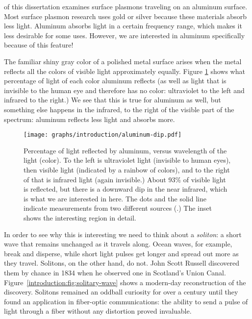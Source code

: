 of this dissertation examines surface plasmons traveling on an aluminum surface.
Most surface plasmon research uses gold or silver because these materials absorb less light.
Aluminum absorbs light in a certain frequency range, which makes it less desirable for some uses.
However, we are interested in aluminum specifically because of this feature!

The familiar shiny gray color of a polished metal surface arises when the metal reflects all the colors of visible light approximately equally.
Figure \ref{introduction:fig:aluminum-dip} shows what percentage of light of each color aluminum reflects (as well as light that is invisible to the human eye and therefore has no color: ultraviolet to the left and infrared to the right.) We see that this is true for aluminum as well, but something else happens in the infrared, to the right of the visible part of the spectrum: aluminum reflects less light and absorbs more.

\begin{figure}[tb]
  \forcerectofloat\centering
  \texttt{[image: graphs/introduction/aluminum-dip.pdf]}
  \caption{Percentage of light reflected by aluminum, versus wavelength of the light (color).
To the left is ultraviolet light (invisible to human eyes), then visible light (indicated by a rainbow of colors), and to the right of that is infrared light (again invisible.)
About 93\% of visible light is reflected, but there is a downward dip in the near infrared, which is what we are interested in here.
The dots and the solid line indicate measurements from two different sources (.)
The inset shows the interesting region in detail.}
  \label{introduction:fig:aluminum-dip}
\end{figure}

In order to see why this is interesting we need to think about a \emph{soliton}: a short wave that remains unchanged as it travels along.
Ocean waves, for example, break and disperse, while short light pulses get longer and spread out more as they travel.
Solitons, on the other hand, do not.
John Scott Russell discovered them by chance in 1834 when he observed one in Scotland's Union Canal.
Figure~\ref{introduction:fig:solitary-wave} shows a modern-day reconstruction of the discovery.
Solitons remained an oddball curiosity for over a century until they found an application in fiber-optic communications: the ability to send a pulse of light through a fiber without any distortion proved invaluable.

